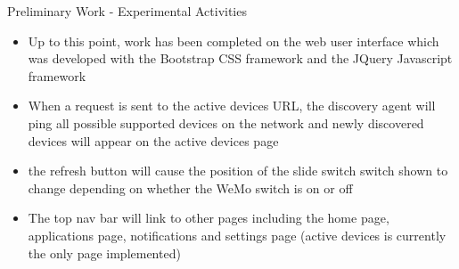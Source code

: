 \documentclass{beamer}
\begin{document}
\begin{frame}{Preliminary Work - Experimental Activities}{}
    \begin{itemize}
        \item Up to this point, work has been completed on the web user interface which was developed with the Bootstrap CSS framework and the JQuery Javascript framework
        \item When a request is sent to the active devices URL, the discovery agent will ping all possible supported devices on the network and newly discovered devices will appear on the active devices page
        \item the refresh button will cause the position of the slide switch switch shown to change depending on whether the WeMo switch is on or off
        \item The top nav bar will link to other pages including the home page, applications page, notifications and settings page (active devices is currently the only page implemented)
    \end{itemize}
\end{frame}
\end{document}
